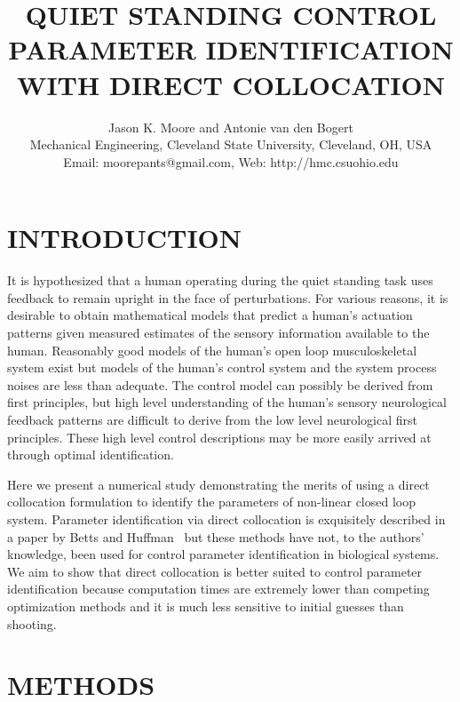 \documentclass[11pt,a4paper,twocolumn]{article}
\title{\ElevenPtFont\textbf{QUIET STANDING CONTROL PARAMETER IDENTIFICATION WITH DIRECT
  COLLOCATION}}
\author{Jason K. Moore and Antonie van den Bogert\\
Mechanical Engineering, Cleveland State University, Cleveland, OH, USA\\
Email: moorepants@gmail.com, Web: http://hmc.csuohio.edu}
\date{}
\newcommand*{\ElevenPtFont}{%
      \fontsize{11}{20}%
      \selectfont}
\begin{document}
\maketitle

\thispagestyle{firststyle}

\section*{\ElevenPtFont INTRODUCTION}

It is hypothesized that a human operating during the quiet standing task uses
feedback to remain upright in the face of perturbations. For various reasons,
it is desirable to obtain mathematical models that predict a human's actuation
patterns given measured estimates of the sensory information available to the
human. Reasonably good models of the human's open loop musculoskeletal system
exist but models of the human's control system and the system process noises
are less than adequate. The control model can possibly be derived from first
principles, but high level understanding of the human's sensory neurological
feedback patterns are difficult to derive from the low level neurological first
principles. These high level control descriptions may be more easily arrived at
through optimal identification.

Here we present a numerical study demonstrating the merits of using a direct
collocation formulation to identify the parameters of non-linear closed loop
system. Parameter identification via direct collocation is exquisitely
described in a paper by Betts and Huffman~\cite{Betts2003} but these methods
have not, to the authors' knowledge, been used for control parameter
identification in biological systems. We aim to show that direct collocation is
better suited to control parameter identification because computation times are
extremely lower than competing optimization methods and it is much less
sensitive to initial guesses than shooting.

\section*{\ElevenPtFont METHODS}
\end{document}
